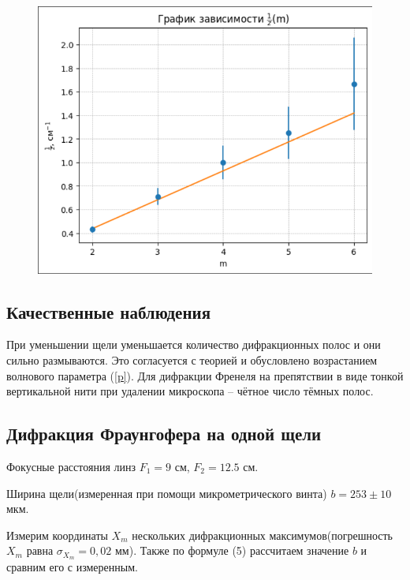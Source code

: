 \documentclass[a4paper,12pt]{article}
\begin{document}
\begin{figure}[H]
	\centering
	\includegraphics[scale=0.75]{z.png}
	\label{graph1}
\end{figure}

\subsection{Качественные наблюдения}
При уменьшении щели уменьшается количество дифракционных 
полос и они сильно размываются. Это согласуется с теорией и обусловлено возрастанием 
волнового параметра (\ref{p}). 
Для дифракции Френеля на препятствии в виде тонкой вертикальной 
нити при удалении микроскопа – чётное число тёмных полос.

\subsection{Дифракция Фраунгофера на одной щели}
Фокусные расстояния линз $F_1 = 9$ см, $F_2 = 12.5$ см.

Ширина щели(измеренная при помощи микрометрического винта) $b = 253 \pm 10$ мкм.

Измерим координаты $X_m$ нескольких дифракционных максимумов(погрешность $X_m$ равна $\sigma_{X_m} = 0,02$ мм). Также по формуле (5) рассчитаем значение $b$ и сравним его с измеренным.
\end{document}
